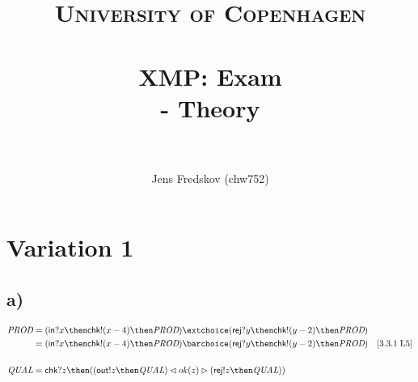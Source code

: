 \documentclass[a4paper, 11pt]{article}
\title{ 
\normalfont \normalsize 
\textsc{University of Copenhagen} \\ [25pt]
\horrule{0.5pt} \\[0.4cm]
\huge XMP: Exam \\ \Large - Theory \\
\horrule{2pt} \\[0.5cm]
}
\author{Jens Fredskov (chw752)}
\def\Prod{\textit{PROD}}
\def\Qual{\textit{QUAL}}
\def\inc{\textsf{in}}
\def\chk{\textsf{chk}}
\def\rej{\textsf{rej}}
\def\outc{\textsf{out}}
\newcommand{\law}[2]{[#1\;\text{#2}]}
\begin{document}
\maketitle
\pagebreak

\section{Variation 1} %
\label{sec:variation_1}

\subsection{a)} %

\begin{align*}
    \Prod
    &= (\inc ? x \then \chk ! (x-4) \then \Prod) \extchoice
       (\rej ? y \then \chk ! (y-2) \then \Prod) \\
    &= (\inc ? x \then \chk ! (x-4) \then \Prod) \barchoice
       (\rej ? y \then \chk ! (y-2) \then \Prod) & \law{3.3.1}{L5} \\ \\
    \Qual
    &= \chk ? z \then ((\outc ! z \then \Qual) \lhd ok(z) \rhd
                       (\rej ! z \then \Qual))
\end{align*}
\end{document}
